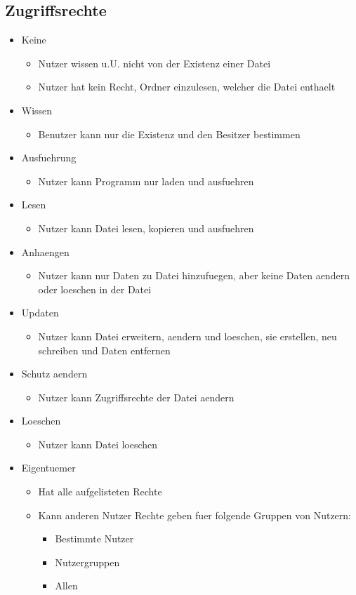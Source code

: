 \documentclass[a4paper]{scrreprt}
\begin{document}
\subsection{Zugriffsrechte}
\begin{itemize}
	\item Keine
		\begin{itemize}
			\item Nutzer wissen u.U. nicht von der Existenz einer Datei
			\item Nutzer hat kein Recht, Ordner einzulesen, welcher die Datei enthaelt
		\end{itemize}
	\item Wissen
		\begin{itemize}
			\item Benutzer kann nur die Existenz und den Besitzer bestimmen
		\end{itemize}
	\item Ausfuehrung
		\begin{itemize}
			\item Nutzer kann Programm nur laden und ausfuehren
		\end{itemize}	
	\item Lesen
		\begin{itemize}
			\item Nutzer kann Datei lesen, kopieren und ausfuehren
		\end{itemize}
	\item Anhaengen
		\begin{itemize}
			\item Nutzer kann nur Daten zu Datei hinzufuegen, aber keine Daten aendern oder loeschen in der Datei
		\end{itemize}
	\item Updaten
		\begin{itemize}
			\item Nutzer kann Datei erweitern, aendern und loeschen, sie erstellen, neu schreiben und Daten entfernen
		\end{itemize}
	\item Schutz aendern
		\begin{itemize}
			\item Nutzer kann Zugriffsrechte der Datei aendern
		\end{itemize}
	\item Loeschen
		\begin{itemize}
			\item Nutzer kann Datei loeschen
		\end{itemize}
	\item Eigentuemer
		\begin{itemize}
			\item Hat alle aufgelisteten Rechte
			\item Kann anderen Nutzer Rechte geben fuer folgende Gruppen von Nutzern:
				\begin{itemize}
					\item Bestimmte Nutzer
					\item Nutzergruppen
					\item Allen
				\end{itemize}
		\end{itemize}
\end{itemize}
\end{document}
